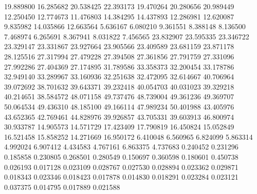 19.889800
16.285682
20.538425
22.393173
19.470264
20.280656
20.989449
12.250450
12.774673
11.476803
14.384295
14.437893
12.286981
12.620087
9.835982
14.035866
12.663564
5.636167
6.080210
9.361551
8.388148
8.136500
7.468974
6.265691
8.367941
8.031822
7.456565
23.832907
23.595335
23.346722
23.329147
23.331867
23.927664
23.905566
23.409589
23.681159
23.871178
28.125516
27.317994
27.479228
27.394508
27.361856
27.791759
27.331096
27.992286
27.404369
27.174895
31.789586
33.358373
32.200454
33.178786
32.949140
33.289967
33.160936
32.251638
32.472095
32.614667
40.706964
39.072692
38.701632
39.643371
39.232418
40.054703
40.031023
39.329218
40.214651
38.584572
48.071158
49.737476
48.739004
49.361236
49.369707
50.064534
49.436310
48.185100
49.166114
47.989234
50.401988
43.405976
43.652365
42.769461
44.828976
39.926857
43.705331
39.603913
46.800974
30.933787
14.905573
14.571729
17.423409
17.790819
16.450824
15.052849
16.521458
15.858252
14.271669
16.950172
6.410048
6.560965
6.824099
5.863314
4.992024
6.907412
4.434583
4.767161
6.863375
4.737683
0.240452
0.231296
0.185858
0.230805
0.268501
0.280549
0.150697
0.360598
0.180601
0.450738
0.026193
0.017128
0.023109
0.028767
0.027530
0.028894
0.023362
0.029871
0.018343
0.023346
0.018423
0.017878
0.014830
0.018291
0.023284
0.023121
0.037375
0.014795
0.017889
0.021588
